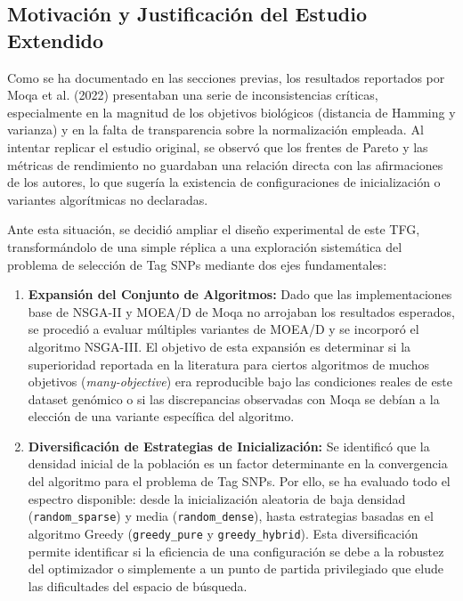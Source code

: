 \documentclass[a4paper,10pt]{article}
\begin{document}
\subsection{Motivación y Justificación del Estudio Extendido}
Como se ha documentado en las secciones previas, los resultados reportados por Moqa et al. (2022) presentaban una serie de inconsistencias críticas, especialmente en la magnitud de los objetivos biológicos (distancia de Hamming y varianza) y en la falta de transparencia sobre la normalización empleada. Al intentar replicar el estudio original, se observó que los frentes de Pareto y las métricas de rendimiento no guardaban una relación directa con las afirmaciones de los autores, lo que sugería la existencia de configuraciones de inicialización o variantes algorítmicas no declaradas.

Ante esta situación, se decidió ampliar el diseño experimental de este TFG, transformándolo de una simple réplica a una exploración sistemática del problema de selección de Tag SNPs mediante dos ejes fundamentales:

\begin{enumerate}
    \item \textbf{Expansión del Conjunto de Algoritmos:} Dado que las implementaciones base de NSGA-II y MOEA/D de Moqa no arrojaban los resultados esperados, se procedió a evaluar múltiples variantes de MOEA/D y se incorporó el algoritmo NSGA-III. El objetivo de esta expansión es determinar si la superioridad reportada en la literatura para ciertos algoritmos de muchos objetivos (\textit{many-objective}) era reproducible bajo las condiciones reales de este dataset genómico o si las discrepancias observadas con Moqa se debían a la elección de una variante específica del algoritmo.
    
    \item \textbf{Diversificación de Estrategias de Inicialización:} Se identificó que la densidad inicial de la población es un factor determinante en la convergencia del algoritmo para el problema de Tag SNPs. Por ello, se ha evaluado todo el espectro disponible: desde la inicialización aleatoria de baja densidad (\texttt{random\_sparse}) y media (\texttt{random\_dense}), hasta estrategias basadas en el algoritmo Greedy (\texttt{greedy\_pure} y \texttt{greedy\_hybrid}). Esta diversificación permite identificar si la eficiencia de una configuración se debe a la robustez del optimizador o simplemente a un punto de partida privilegiado que elude las dificultades del espacio de búsqueda.
\end{enumerate}
\end{document}
